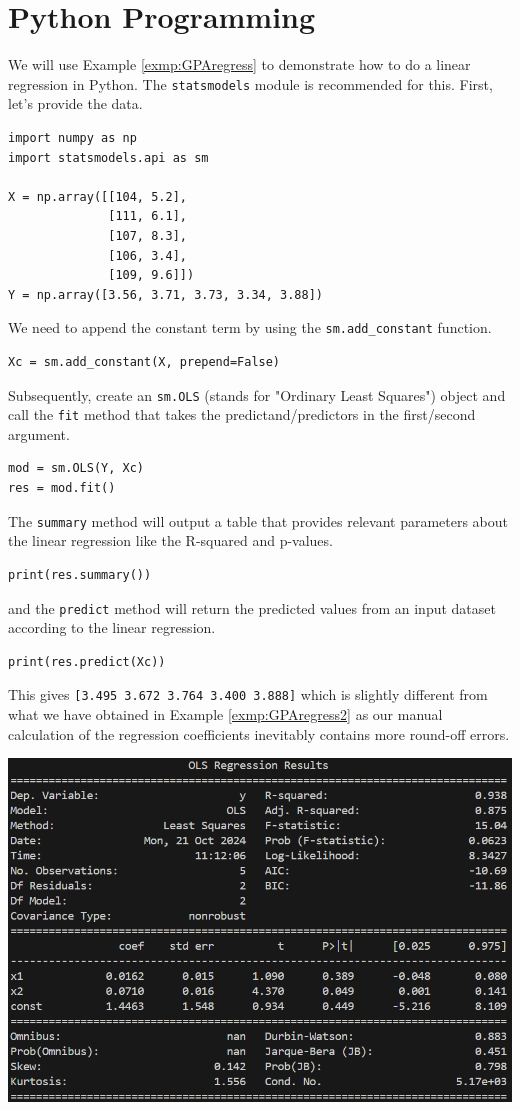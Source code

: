 \section{Python Programming}

We will use Example \ref{exmp:GPAregress} to demonstrate how to do a linear regression in Python. The \verb|statsmodels| module is recommended for this. First, let's provide the data.
\begin{lstlisting}
import numpy as np
import statsmodels.api as sm

X = np.array([[104, 5.2],
              [111, 6.1],
              [107, 8.3],
              [106, 3.4],
              [109, 9.6]]) 
Y = np.array([3.56, 3.71, 3.73, 3.34, 3.88])
\end{lstlisting}
We need to append the constant term by using the \verb|sm.add_constant| function.
\begin{lstlisting}
Xc = sm.add_constant(X, prepend=False)    
\end{lstlisting}
Subsequently, create an \verb|sm.OLS| (stands for "Ordinary Least Squares") object and call the \verb|fit| method that takes the predictand/predictors in the first/second argument.
\begin{lstlisting}
mod = sm.OLS(Y, Xc)
res = mod.fit()
\end{lstlisting}
The \verb|summary| method will output a table that provides relevant parameters about the linear regression like the R-squared and p-values.
\begin{lstlisting}
print(res.summary())
\end{lstlisting}
and the \verb|predict| method will return the predicted values from an input dataset according to the linear regression.
\begin{lstlisting}
print(res.predict(Xc))    
\end{lstlisting}
This gives \verb|[3.495 3.672 3.764 3.400 3.888]| which is slightly different from what we have obtained in Example \ref{exmp:GPAregress2} as our manual calculation of the regression coefficients inevitably contains more round-off errors. \par
\includegraphics[width=\textwidth]{graphics/OLS_table.png}

